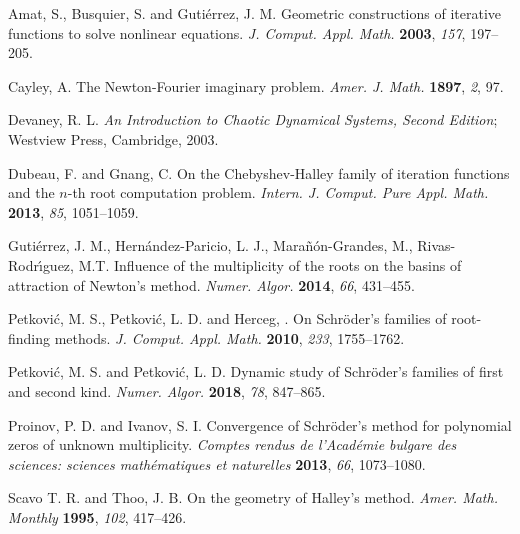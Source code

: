 \documentclass[10pt,a4paper]{article}
\begin{document}
\begin{thebibliography}{plain}


Amat, S., Busquier, S. and Guti\'errez, J. M. Geometric constructions of iterative functions to solve nonlinear equations. {\em J. Comput. Appl. Math.} {\bf 2003}, {\em 157}, 197--205.

Cayley, A. The Newton-Fourier imaginary problem. {\em Amer. J.  Math.} {\bf 1897}, {\em 2}, 97.

Devaney, R. L. {\em An Introduction to Chaotic Dynamical Systems, Second Edition}; Westview Press, Cambridge, 2003.

Dubeau, F. and Gnang,  C. On the Chebyshev-Halley family of iteration functions and the $n$-th root computation problem. {\em Intern. J. Comput. Pure Appl. Math.} {\bf 2013}, {\em 85}, 1051--1059.

Guti\'errez, J. M., Hern\'andez-Paricio, L. J., Mara\~n\'on-Grandes, M., Rivas-Rodr{\'\i}guez, M.T.  Influence of the multiplicity of the roots on the basins of attraction of Newton's method. {\em Numer. Algor.} {\bf 2014}, {\em 66}, 431--455.



Petkovi\'c, M. S., Petkovi\'c, L. D. and Herceg, \DJ. On Schr\"oder's families of root-finding methods. {\em J. Comput. Appl. Math.} {\bf 2010}, {\em 233}, 1755--1762.

Petkovi\'c, M. S. and  Petkovi\'c, L. D. Dynamic study of Schr\"oder's families of first and second kind. {\em Numer. Algor.} {\bf 2018}, {\em 78}, 847--865.

Proinov, P. D. and Ivanov, S. I. Convergence of Schr\"oder's method for polynomial zeros of unknown multiplicity. {\em Comptes rendus de l'Acad\'emie bulgare des sciences: sciences math\'ematiques et naturelles} {\bf 2013}, {\em 66}, 1073--1080.

Scavo T. R. and Thoo, J. B. On the geometry of Halley's method. {\em Amer. Math. Monthly} {\bf 1995}, {\em 102}, 417--426.


\end{thebibliography}
\end{document}
